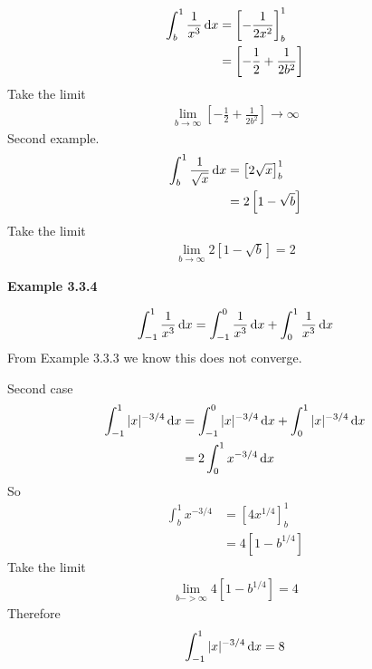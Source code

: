 \begin{align*}
\int_b^1 \frac{1}{x^3} \, {\rm d}x &= \left[-\frac{1}{2x^2}\right]_b^1 \\
   &= \left[-\frac{1}{2} + \frac{1}{2b^2}\right]
\end{align*}
Take the limit
\begin{align*}
    \lim_{b\rightarrow\infty} \left[-\frac{1}{2} + \frac{1}{2b^2}\right] \rightarrow \infty
\end{align*}
Second example.
\begin{align*}
    \int_b^1 \frac{1}{\sqrt{x}} \, {\rm d}x &= \left[2\sqrt{x}\right]_b^1 \\
   &= 2\left[1 - \sqrt{b}\right]
\end{align*}
Take the limit
\begin{align*}
    \lim_{b\rightarrow\infty} 2\left[1 - \sqrt{b}\right] = 2
\end{align*}

\vspace{10mm}
\textbf{Example 3.3.4}

\begin{align*}
\int_{-1}^1 \frac{1}{x^3} \, {\rm d}x = \int_{-1}^0 \frac{1}{x^3} \, {\rm d}x + \int_{0}^1 \frac{1}{x^3} \, {\rm d}x
\end{align*}
From Example 3.3.3 we know this does not converge.

Second case
\begin{align*}
\int_{-1}^1 |x|^{-3/4}\, {\rm d}x &= \int_{-1}^0 |x|^{-3/4}\, {\rm d}x + \int_{0}^1 |x|^{-3/4}\, {\rm d}x \\
&= 2 \int_{0}^1 x^{-3/4}\, {\rm d}x
\end{align*}
So
\begin{align*}
\int_{b}^1 x^{-3/4} &= \left[4x^{1/4} \right]_b^1 \\
&= 4[1-b^{1/4}]
\end{align*}
Take the limit
\begin{align*}
\lim_{b->\infty} 4[1-b^{1/4}] = 4
\end{align*}
Therefore
\begin{align*}
\int_{-1}^1 |x|^{-3/4}\, {\rm d}x = 8
\end{align*}